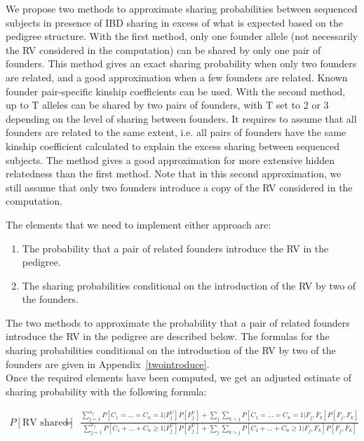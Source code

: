 \documentclass[12pt]{aastex}
\begin{document}
We propose two methods to approximate sharing probabilities between sequenced subjects in presence of IBD sharing in excess of what is expected based on the pedigree structure. With the first method, only one founder allele (not necessarily the RV considered in the computation) can be shared by only one pair of founders. This method gives an exact sharing probability when only two founders are related, and a good approximation when a few founders are related. Known founder pair-specific kinship coefficients can be used. With the second method, up to T alleles can be shared by two pairs of founders, with T set to 2 or 3 depending on the level of sharing between founders. It requires to assume that all founders are related to the same extent, i.e. all pairs of founders have the same kinship coefficient calculated to explain the excess sharing between sequenced subjects. The method gives a good approximation for more extensive hidden relatedness than the first method. Note that in this second approximation, we still assume that only two founders introduce a copy of the RV considered in the computation.

The elements that we need to implement either approach are:

\begin{enumerate}
  \item The probability that a pair of related founders introduce the RV in the pedigree.
  \item The sharing probabilities conditional on the introduction of the RV by two of the founders.
\end{enumerate}

The two methods to approximate the probability that a pair of related founders introduce the RV in the pedigree are described below. The formulas for the sharing probabilities conditional on the introduction of the RV by two of the founders are given in Appendix~\ref{twointroduce}.\\ 

Once the required elements have been computed, we get an adjusted estimate of sharing probability with the following formula:

 \begin{eqnarray}
P[\mbox{RV shared}] 
 &=& \frac{\sum_{j=1}^{n_f} P[C_1 = \dots = C_n = 1 | F_j^U] P[F_j^U] + \sum_j \sum_{k>j}  P[C_1 = \dots = C_n = 1 | F_j, F_k] P[F_j, F_k] }{\sum_{j=1}^{n_f} P[C_1 + \dots + C_n \geq 1 | F_j^U]P[F_j^U] + \sum_j \sum_{k>j}  P[C_1 + \dots + C_n \geq 1 | F_j, F_k]P[F_j, F_k]}
\end{eqnarray}
\end{document}
